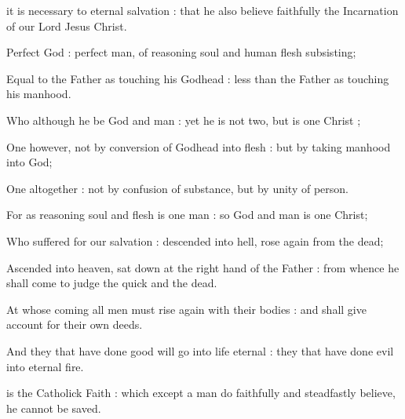 {     it is necessary to eternal salvation : that he also believe faithfully the Incarnation of our Lord Jesus Christ.\par
    Perfect God : perfect man, of reasoning soul and human flesh subsisting;\par
    Equal to the Father as touching his Godhead : less than the Father as touching his manhood.\par
    Who although he be God and man : yet he is not two, but is one Christ ;\par
    One however, not by conversion of Godhead into flesh : but by taking manhood into God;\par
    One altogether : not by confusion of substance, but by unity of person.\par
    For as reasoning soul and flesh is one man : so God and man is one Christ;\par
    Who suffered for our salvation : descended into hell, rose again from the dead;\par
    Ascended into heaven, sat down at the right hand of the Father : from whence he shall come to judge the quick and the dead.\par
    At whose coming all men must rise again with their bodies : and shall give account for their own deeds.\par
    And they that have done good will go into life eternal : they that have done evil into eternal fire.\par

     is the Catholick Faith : which except a man do faithfully and steadfastly believe, he cannot be saved.\par
    }
